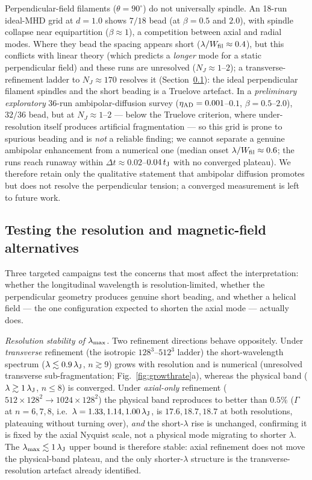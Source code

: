 \documentclass[usenatbib,twoside,twocolumn]{mnras}
\begin{document}
Perpendicular-field filaments ($\theta=90^\circ$) do not universally spindle. An 18-run ideal-MHD grid at $d=1.0$ shows $7/18$ bead (at $\beta=0.5$ and $2.0$), with spindle collapse near equipartition ($\beta\approx1$), a competition between axial and radial modes. Where they bead the spacing appears short ($\lambda/W_{\rm fil}\approx0.4$), but this conflicts with linear theory (which predicts a \emph{longer} mode for a static perpendicular field) and these runs are unresolved ($N_J\approx1$--$2$); a transverse-refinement ladder to $N_J\approx170$ resolves it (Section~\ref{sec:optional_tests}): the ideal perpendicular filament spindles and the short beading is a Truelove artefact. In a \emph{preliminary exploratory} 36-run ambipolar-diffusion survey ($\eta_{\rm AD}=0.001$--$0.1$, $\beta=0.5$--$2.0$), $32/36$ bead, but at $N_J\approx1$--$2$ --- below the Truelove criterion, where under-resolution itself produces artificial fragmentation \citep{Truelove1997} --- so this grid is prone to spurious beading and is \emph{not} a reliable finding; we cannot separate a genuine ambipolar enhancement from a numerical one (median onset $\lambda/W_{\rm fil}\approx0.6$; the runs reach runaway within $\Delta t\approx0.02$--$0.04\,t_{\rm J}$ with no converged plateau). We therefore retain only the qualitative statement that ambipolar diffusion promotes but does not resolve the perpendicular tension; a converged measurement is left to future work.

\subsection{Testing the resolution and magnetic-field alternatives}
\label{sec:optional_tests}
Three targeted campaigns test the concerns that most affect the interpretation: whether the longitudinal wavelength is resolution-limited, whether the perpendicular geometry produces genuine short beading, and whether a helical field --- the one configuration expected to shorten the axial mode --- actually does.

\emph{Resolution stability of $\lambda_{\rm max}$.} Two refinement directions behave oppositely. Under \emph{transverse} refinement (the isotropic $128^3$--$512^3$ ladder) the short-wavelength spectrum ($\lambda\lesssim0.9\,\lambda_{\rm J}$, $n\gtrsim9$) grows with resolution and is numerical (unresolved transverse sub-fragmentation; Fig.~\ref{fig:growthrate}a), whereas the physical band ($\lambda\gtrsim1\,\lambda_{\rm J}$, $n\leq8$) is converged. Under \emph{axial-only} refinement ($512\times128^2\to1024\times128^2$) the physical band reproduces to better than $0.5\%$ ($\Gamma$ at $n=6,7,8$, i.e.\ $\lambda=1.33,1.14,1.00\,\lambda_{\rm J}$, is $17.6,18.7,18.7$ at both resolutions, plateauing without turning over), \emph{and} the short-$\lambda$ rise is unchanged, confirming it is fixed by the axial Nyquist scale, not a physical mode migrating to shorter $\lambda$. The $\lambda_{\rm max}\lesssim1\,\lambda_{\rm J}$ upper bound is therefore stable: axial refinement does not move the physical-band plateau, and the only shorter-$\lambda$ structure is the transverse-resolution artefact already identified.
\end{document}
